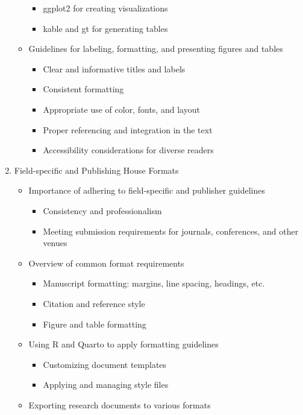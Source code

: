 \documentclass[
  letterpaper,
]{latex/krantz}
\providecommand{\tightlist}{%
  \setlength{\itemsep}{0pt}\setlength{\parskip}{0pt}}\usepackage{longtable,booktabs,array}
\begin{document}
\begin{enumerate}
\begin{itemize}
    \begin{itemize}
    \tightlist
    \item
      ggplot2 for creating visualizations
    \item
      kable and gt for generating tables
    \end{itemize}
  \item
    Guidelines for labeling, formatting, and presenting figures and
    tables

    \begin{itemize}
    \tightlist
    \item
      Clear and informative titles and labels
    \item
      Consistent formatting
    \item
      Appropriate use of color, fonts, and layout
    \item
      Proper referencing and integration in the text
    \item
      Accessibility considerations for diverse readers
    \end{itemize}
  \end{itemize}
\item
  Field-specific and Publishing House Formats

  \begin{itemize}
  \tightlist
  \item
    Importance of adhering to field-specific and publisher guidelines

    \begin{itemize}
    \tightlist
    \item
      Consistency and professionalism
    \item
      Meeting submission requirements for journals, conferences, and
      other venues
    \end{itemize}
  \item
    Overview of common format requirements

    \begin{itemize}
    \tightlist
    \item
      Manuscript formatting: margins, line spacing, headings, etc.
    \item
      Citation and reference style
    \item
      Figure and table formatting
    \end{itemize}
  \item
    Using R and Quarto to apply formatting guidelines

    \begin{itemize}
    \tightlist
    \item
      Customizing document templates
    \item
      Applying and managing style files
    \end{itemize}
  \item
    Exporting research documents to various formats


\end{itemize}
\end{enumerate}
\end{document}
